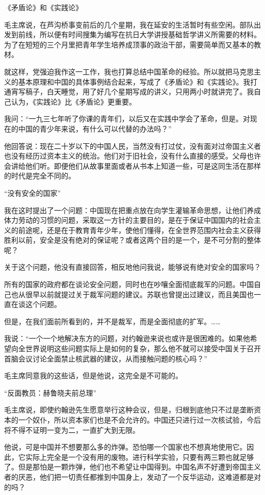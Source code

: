 《矛盾论》和《实践论》

毛主席说，在芦沟桥事变前后的几个星期，我在延安的生活暂时有些空闲。部队出发到前线，所以便有时间搜集为编写在抗日大学讲授基础哲学讲义所需要的材料。为了在短短的三个月里把青年学生培养成顶事的政治干部，需要简单而又基本的教材。

就这样，党强迫我作这一工作，我也打算总结中国革命的经验。所以就把马克思主义的基本原理和中国的具体事例结合起来，写成了《矛盾论》和《实践论》。我打通宵写稿子，白天睡觉，用了好几个星期写成的讲义，只用两小时就讲完了。我自己认为，《实践论》比《矛盾论》更重要。

我问：“一九三七年听了你课的青年们，以后又在实践中学会了革命，但是。对现在的中国的青少年来说，有什么可以代替的办法吗？”

他回答说：现在二十岁以下的中国人民，当然没有打过仗，没有面对过帝国主义者也没有经历过资本主义的统治。他们对于旧社会，没有什么直接的感受。父母也许会讲给他们听。即便他们从故事里面或者从书本上知道一些，可是这同生活在那样的时代是完全不同的。

“没有安全的国家”

我在这时提出了一个问题：中国现在把重点放在向学生灌输革命思想，让他们养成体力劳动的习惯的问题，采取这一方针的主要目的，是在于保证中国国内的社会主义的前途呢，还是在于教育青年少年，使他们懂得，在全世界范围内社会主义获得胜利以前，安全是没有绝对的保证呢？或者这两个目的是一个，是不可分割的整体呢？

关于这个问题，他没有直接回答，相反地他问我说，能够说有绝对安全的国家吗？

所有的国家的政府都在谈论安全问题，同时也在吵嚷全面彻底裁军的问题。中国自己也从很早以前就提过关于裁军问题的建议。苏联也曾提出过建议，而且美国也一直在谈这个问题。

但是，在我们面前所看到的，并不是裁军，而是全面彻底的扩军。……

我说：“一个一个地解决东方的问题，对约翰逊来说也或许是很困难的。如果他希望向全世界说明这些问题实际上是如何的复杂，那么他不就可以接受中国关于召开首脑会议讨论全面禁止核武器的建议，从而接触问题的核心吗？”

毛主席同意我的这些话，但是他说，这完全是不可能的。

“反面教员：赫鲁晓夫前总理”

毛主席说，即使约翰逊先生愿意举行这种会议，但是，归根到底他只不过是垄断资本的一个奴仆，所以资本家们也是不会允许的。中国还只进行过一次核试验，今后将不得不证明一变为二，一直扩大到无限。

他说，可是中国并不想要那么多的炸弹。恐怕哪一个国家也不想真地使用它。因此，它实际上完全是一个没有用的废物。进行科学实验，只要有两三颗也就足够了。但是那怕是一颗炸弹，他们也不希望让中国得到。中国名声不好遭到帝国主义者的厌恶，他们把一切责任都推到中国身上，发动了一个反华运动，这难道都是对的吗？

